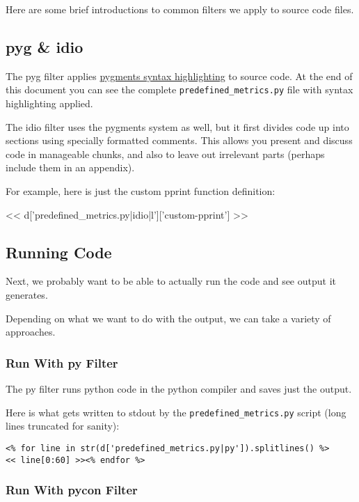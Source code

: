 \documentclass[%
 reprint,
 amsmath,amssymb,
 aps,
]{revtex4-1}
\begin{document}
Here are some brief introductions to common filters we apply to source code files.

\subsection{\label{sec:level2}pyg \& idio}

The pyg filter applies \href{https://pygments.org/}{pygments syntax highlighting} to source code. At the end of this document you can see the complete \verb|predefined_metrics.py| file with syntax highlighting applied.

The idio filter uses the pygments system as well, but it first divides code up
into sections using specially formatted comments. This allows you present and
discuss code in manageable chunks, and also to leave out irrelevant parts
(perhaps include them in an appendix).

For example, here is just the custom pprint function definition:

<< d['predefined_metrics.py|idio|l']['custom-pprint'] >>


\subsection{\label{sec:level2}Running Code}

Next, we probably want to be able to actually run the code and see output it generates.

Depending on what we want to do with the output, we can take a variety of approaches.

\subsubsection{\label{sec:level3}Run With py Filter}

The py filter runs python code in the python compiler and saves just the output.

Here is what gets written to stdout by the \verb|predefined_metrics.py| script (long lines truncated for sanity):

\footnotesize
\begin{Verbatim}
<% for line in str(d['predefined_metrics.py|py']).splitlines() %>
<< line[0:60] >><% endfor %>
\end{Verbatim}

\subsubsection{\label{sec:level3}Run With pycon Filter}
\end{document}
